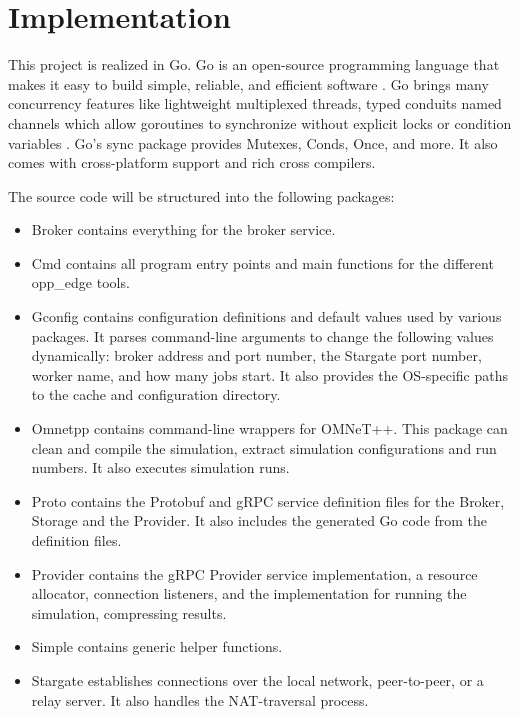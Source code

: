 \chapter{Implementation}

This project is realized in Go. Go is an open-source programming language that makes it easy to build simple, reliable, and efficient software \cite{go:web}. Go brings many concurrency features like lightweight multiplexed threads, typed conduits named channels which allow goroutines to synchronize without explicit locks or condition variables \cite{go:tour}. Go's sync package provides Mutexes, Conds, Once, and more. It also comes with cross-platform support and rich cross compilers.

The source code will be structured into the following packages: 
\begin{itemize}
  \item Broker contains everything for the broker service.
  
  \item Cmd contains all program entry points and main functions for the different opp\_edge tools.
  
  \item Gconfig contains configuration definitions and default values used by various packages. It parses command-line arguments to change the following values dynamically: broker address and port number, the Stargate port number, worker name, and how many jobs start. It also provides the OS-specific paths to the cache and configuration directory.
  
    \item Omnetpp contains command-line wrappers for OMNeT++. This package can clean and compile the simulation, extract simulation configurations and run numbers. It also executes simulation runs.
    
    \item Proto contains the Protobuf and gRPC service definition files for the Broker, Storage and the Provider. It also includes the generated Go code from the definition files.

    \item Provider contains the gRPC Provider service implementation, a resource allocator, connection listeners, and the implementation for running the simulation, compressing results.

    \item Simple contains generic helper functions.
    
    \item Stargate establishes connections over the local network, peer-to-peer, or a relay server. It also handles the NAT-traversal process.
    

\end{itemize}
